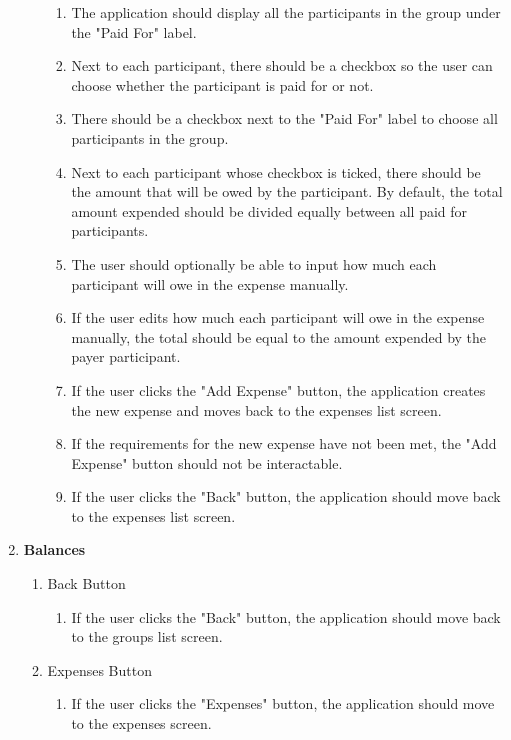 \documentclass[conference]{IEEEtran}
\begin{document}
\begin{enumerate}
\begin{enumerate}
\begin{enumerate}
                        \item The application should display all the participants in the group under the "Paid For" label.
                        \item Next to each participant, there should be a checkbox so the user can choose whether the participant is paid for or not.
                        \item There should be a checkbox next to the "Paid For" label to choose all participants in the group.
                        \item Next to each participant whose checkbox is ticked, there should be the amount that will be owed by the participant. By default, the total amount expended should be divided equally between all paid for participants.
                        \item The user should optionally be able to input how much each participant will owe in the expense manually.
                        \item If the user edits how much each participant will owe in the expense manually, the total should be equal to the amount expended by the payer participant.
                        \item If the user clicks the "Add Expense" button, the application creates the new expense and moves back to the expenses list screen.
                        \item If the requirements for the new expense have not been met, the "Add Expense" button should not be interactable.
                        \item If the user clicks the "Back" button, the application should move back to the expenses list screen.
                    \end{enumerate}
            \end{enumerate}
        \item \textbf{Balances}
            \begin{enumerate}
                \item Back Button
                    \begin{enumerate}
                        \item If the user clicks the "Back" button, the application should move back to the groups list screen.
                    \end{enumerate}
                \item Expenses Button
                    \begin{enumerate}
                        \item If the user clicks the "Expenses" button, the application should move to the expenses screen.

\end{enumerate}
\end{enumerate}
\end{enumerate}
\end{document}
